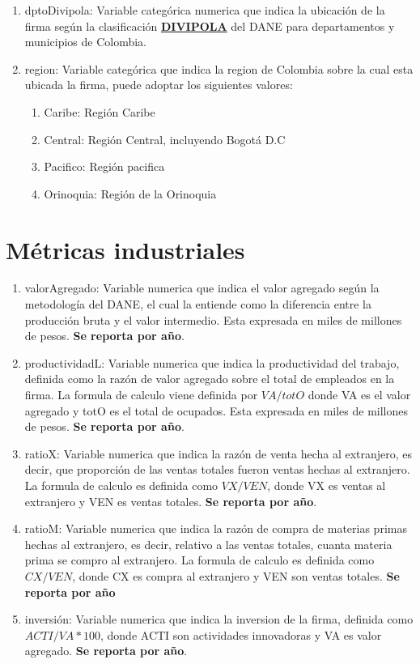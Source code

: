 \documentclass[12pt,a4paper]{article}
\begin{document}
\begin{enumerate}
	\item dptoDivipola: Variable categórica numerica que indica la ubicación de la firma según la clasificación \href{https://geoportal.dane.gov.co/geovisores/territorio/consulta-divipola-division-politico-administrativa-de-colombia/}{\textbf{DIVIPOLA}} del DANE para departamentos y municipios de Colombia. 
	\item region: Variable categórica que indica la region de Colombia sobre la cual esta ubicada la firma, puede adoptar los siguientes valores:
		\begin{enumerate}
			\item Caribe: Región Caribe
			\item Central: Región Central, incluyendo Bogotá D.C 
			\item Pacifico: Región pacifica
			\item Orinoquia: Región de la Orinoquia
		\end{enumerate}
\end{enumerate} 

\section{Métricas industriales}

\begin{enumerate}
	\item valorAgregado: Variable numerica que indica el valor agregado según la metodología del DANE, el cual la entiende como la diferencia entre la producción bruta y el valor intermedio. Esta expresada en miles de millones de pesos. \textbf{Se reporta por año}.
	\item productividadL: Variable numerica que indica la productividad del trabajo, definida como la razón de valor agregado sobre el total de empleados en la firma. La formula de calculo viene definida por $ VA / totO $ donde VA es el valor agregado y totO es el total de ocupados. Esta expresada en miles de millones de pesos. \textbf{Se reporta por año}.
	\item ratioX: Variable numerica que indica la razón de venta hecha al extranjero, es decir, que proporción de las ventas totales fueron ventas hechas al extranjero. La formula de calculo es definida como $ VX / VEN $, donde VX es ventas al extranjero y VEN es ventas totales. \textbf{Se reporta por año}.
	\item ratioM: Variable numerica que indica la razón de compra de materias primas hechas al extranjero, es decir, relativo a las ventas totales, cuanta materia prima se compro al extranjero. La formula de calculo es definida como $ CX/VEN $, donde CX es compra al extranjero y VEN son ventas totales. \textbf{Se reporta por año}
	\item inversión: Variable numerica que indica la inversion de la firma, definida como $ ACTI/VA*100 $, donde ACTI son actividades innovadoras y VA es valor agregado. \textbf{Se reporta por año}.
\end{enumerate}
\end{document}
